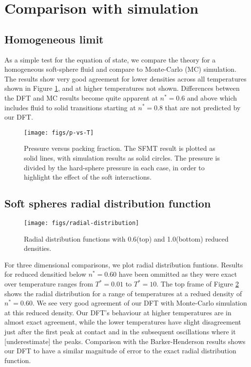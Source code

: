 \documentclass[letterpaper,twocolumn,amsmath,amssymb,prb]{revtex4-1}
\newcommand{\red}[1]{{\color{red} #1}}
\newcommand{\fixme}[1]{\red{[#1]}}
\begin{document}
\section{Comparison with simulation}

\subsection{Homogeneous limit}

As a simple test for the equation of state, we compare the theory for
a homogeneous soft-sphere fluid and compare to Monte-Carlo (MC)
simulation. The results show very good agreement for lower densities
across all temperatures shown in Figure \ref{fig:p-vs-packing}, and at
higher temperatures not shown. Differences between the DFT and MC results
become quite apparent at $n^*=0.6$ and above which includes fluid to solid
transitions starting at $n^*=0.8$ that are not predicted by our DFT.

\begin{figure}
\begin{center}
\texttt{[image: figs/p-vs-T]}
\end{center}
\caption{Pressure versus packing fraction.  The SFMT result is plotted
  as solid lines, with simulation results as solid circles.  The
  pressure is divided by the hard-sphere pressure in each case, in
  order to highlight the effect of the soft interactions.}
\label{fig:p-vs-packing}
\end{figure}

\subsection{Soft spheres radial distribution function}

\begin{figure}
\begin{center}
\texttt{[image: figs/radial-distribution]}
\end{center}
\caption{Radial distribution functions with 0.6(top) and 1.0(bottom) reduced densities.}
\label{fig:radial-distribution}
\end{figure}

For three dimensional comparisons, we plot radial distribution
funtions.  Results for reduced densitied below $n^* = 0.60$ have been
ommitted as they were exact over temperature ranges from $T^*=0.01$ to
$T^*=10$. The top frame of Figure \ref{fig:radial-distribution} shows
the radial distribution for a range of temperatures at a redued
density of $n^* = 0.60$. We see very good agreement of our DFT with
Monte-Carlo simulation at this reduced density. Our DFT's behaviour at
higher temperatures are in almost exact agreement, while the lower
temperatures have slight disagreement just after the first peak at
contact and in the subsequent oscillations where it
\fixme{underestimate} the peaks. Comparison with the Barker-Henderson
results shows our DFT to have a similar magnitude of error to the
exact radial distribution function.
\end{document}
